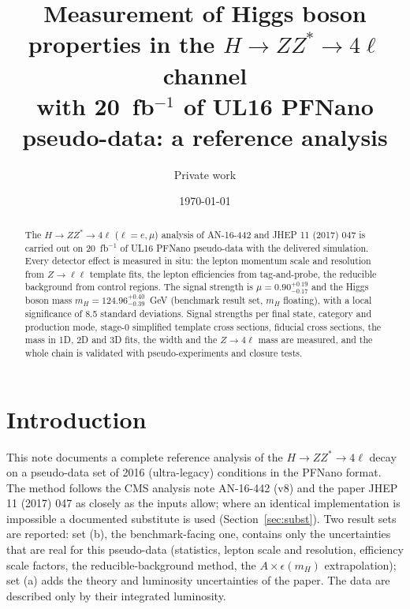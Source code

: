 \documentclass[11pt,a4paper]{article}
\title{Measurement of Higgs boson properties in the $H\to ZZ^*\to 4\ell$ channel\\
with 20~fb$^{-1}$ of UL16 PFNano pseudo-data: a reference analysis}
\author{Private work}
\date{\today}
\begin{document}
\maketitle
\begin{abstract}
The $H\to ZZ^*\to 4\ell$ ($\ell = e,\mu$) analysis of AN-16-442 and JHEP 11 (2017) 047 is carried out on 20~fb$^{-1}$ of UL16 PFNano pseudo-data with the delivered simulation. Every detector effect is measured in situ: the lepton momentum scale and resolution from $Z\to\ell\ell$ template fits, the lepton efficiencies from tag-and-probe, the reducible background from control regions. The signal strength is $\mu = 0.90^{+0.19}_{-0.17}$ and the Higgs boson mass $m_H = 124.96^{+0.40}_{-0.39}$~GeV (benchmark result set, $m_H$ floating), with a local significance of 8.5 standard deviations. Signal strengths per final state, category and production mode, stage-0 simplified template cross sections, fiducial cross sections, the mass in 1D, 2D and 3D fits, the width and the $Z\to4\ell$ mass are measured, and the whole chain is validated with pseudo-experiments and closure tests.
\end{abstract}
\tableofcontents\newpage
\section{Introduction}
This note documents a complete reference analysis of the $H\to ZZ^*\to4\ell$ decay on a pseudo-data set of 2016
(ultra-legacy) conditions in the PFNano format.  The method follows the CMS analysis note AN-16-442 (v8) and the
paper JHEP 11 (2017) 047 as closely as the inputs allow; where an identical implementation is impossible a documented
substitute is used (Section~\ref{sec:subst}).  Two result sets are reported: set (b), the benchmark-facing one, contains
only the uncertainties that are real for this pseudo-data (statistics, lepton scale and resolution, efficiency scale
factors, the reducible-background method, the $A\times\epsilon(m_H)$ extrapolation); set (a) adds the theory and
luminosity uncertainties of the paper.  The data are described only by their integrated luminosity.
\end{document}
